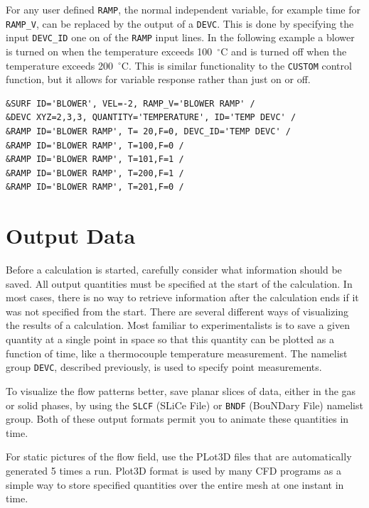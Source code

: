 \documentclass[11pt]{book}
\newcommand{\ct}{\tt\small}
\begin{document}
For any user defined {\ct RAMP}, the normal independent variable, for example time for {\ct RAMP\_V}, can be replaced by the output of a {\ct DEVC}.
This is done by specifying the input {\ct DEVC\_ID} one on of the {\ct RAMP} input lines.
In the following example a blower is turned on when the temperature exceeds 100~$^\circ$C and is turned off when the temperature exceeds 200~$^\circ$C.
This is similar functionality to the {\ct CUSTOM} control function, but it allows for variable response rather than just on or off.

\footnotesize
\begin{verbatim}
&SURF ID='BLOWER', VEL=-2, RAMP_V='BLOWER RAMP' /
&DEVC XYZ=2,3,3, QUANTITY='TEMPERATURE', ID='TEMP DEVC' /
&RAMP ID='BLOWER RAMP', T= 20,F=0, DEVC_ID='TEMP DEVC' /
&RAMP ID='BLOWER RAMP', T=100,F=0 /
&RAMP ID='BLOWER RAMP', T=101,F=1 /
&RAMP ID='BLOWER RAMP', T=200,F=1 /
&RAMP ID='BLOWER RAMP', T=201,F=0 /
\end{verbatim}
\normalsize



%
\newpage



\chapter{Output Data}
\label{info:outputdata}

Before a calculation is started, carefully consider
what information should be saved. All output quantities must be specified
at the start of the calculation. In most cases, there is no way to
retrieve information after the calculation ends if it was not specified from the start.
There are several different ways of visualizing the results of a
calculation. Most familiar to
experimentalists is to save a given quantity at a single point in space so
that this quantity can be plotted as a function of time, like a
thermocouple temperature measurement. The namelist group {\ct DEVC},
described previously, is used to specify point measurements.

To visualize the flow patterns better, save planar
slices of data, either in the gas or solid phases, by using the
{\ct SLCF} (SLiCe File) or {\ct BNDF} (BouNDary File) namelist group.
Both of these output formats permit you to animate these quantities in
time.

For static pictures of the flow field, use the PLot3D files
that are automatically generated 5 times a run. Plot3D format is used by many CFD programs as a simple
way to store specified quantities over the entire mesh at one instant in
time.
\end{document}
